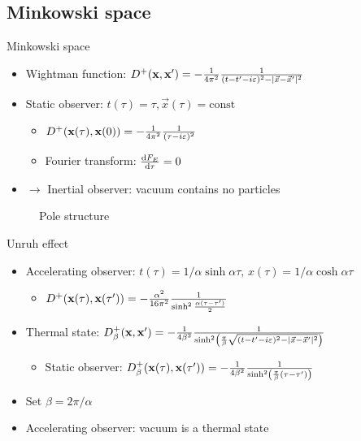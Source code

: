\documentclass{beamer}
\renewcommand{\va}[1]{\vec{#1}}
\begin{document}
\subsection{Minkowski space}
\begin{frame}{Minkowski space\cite{davies}}
\begin{itemize}
	\item Wightman function: \(D^+(\vb{x},\vb{x}') = -\frac{1}{4\pi^2} \frac{1}{(t-t'-i\varepsilon)^2 - |\va{x}-\va{x}'|^2}\)
	\item Static observer: \(t(\tau) = \tau, \va{x}(\tau) = \mathrm{const}\)
	\begin{itemize}
		\item \(D^+(\vb{x}(\tau),\vb{x}(0)) = -\frac{1}{4\pi^2} \frac{1}{(\tau-i\varepsilon)^2}\)
		\item Fourier transform: \(\dv{F_E}{\tau} = 0\)
	\end{itemize}
	\item[]\(\to\) Inertial observer: vacuum contains no particles
\end{itemize}
\begin{figure}
\centering
{}
\caption{Pole structure}
\end{figure}
\end{frame}

\begin{frame}{Unruh effect\cite{davies}}
\begin{itemize}
	\item Accelerating observer: \(t(\tau) = 1/\alpha \sinh \alpha\tau,\,x(\tau) = 1/\alpha \cosh \alpha\tau\)
	\begin{itemize}
		\item \(D^+(\vb{x}(\tau), \vb{x}(\tau')) = -\frac{\alpha^2}{16\pi^2} \frac{1}{\sinh^2\frac{\alpha(\tau-\tau')}{2}}\)
	\end{itemize}
	\item Thermal state: \(D^+_\beta(\vb{x},\vb{x}') = -\frac{1}{4\beta^2} \frac{1}{\sinh[2](\frac{\pi}{\beta}\sqrt{(t-t'-i\varepsilon)^2 - |\va{x}-\va{x}'|^2})}\)
	\begin{itemize}
		\item Static observer: \(D^+_\beta(\vb{x}(\tau),\vb{x}(\tau')) = -\frac{1}{4\beta^2} \frac{1}{\sinh[2](\frac{\pi}{\beta} (\tau-\tau'))}\)
	\end{itemize}
	\item Set \(\beta = 2\pi/\alpha\)
	\item Accelerating observer: vacuum is a thermal state
\end{itemize}
\end{frame}
\end{document}
